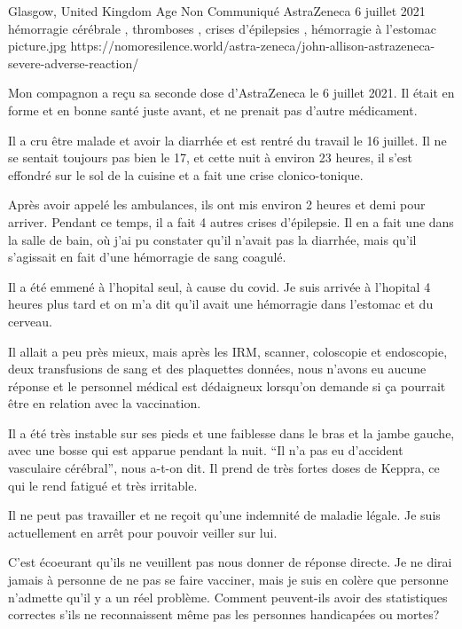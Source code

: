           {Glasgow, United Kingdom}
          {Age Non Communiqué}
          {AstraZeneca}
          {6 juillet 2021}
          {hémorragie cérébrale
            , thromboses
            , crises d'épilepsies
            , hémorragie à l'estomac}
          {picture.jpg}
          {https://nomoresilence.world/astra-zeneca/john-allison-astrazeneca-severe-adverse-reaction/}
          {

Mon compagnon a reçu sa seconde dose d'AstraZeneca le 6 juillet 2021. Il était
en forme et en bonne santé juste avant, et ne prenait pas d'autre médicament.

Il a cru être malade et avoir la diarrhée et est rentré du travail le 16
juillet. Il ne se sentait toujours pas bien le 17, et cette nuit à environ 23
heures, il s'est effondré sur le sol de la cuisine et a fait une crise
clonico-tonique.

Après avoir appelé les ambulances, ils ont mis environ 2 heures et demi pour
arriver. Pendant ce temps, il a fait 4 autres crises d'épilepsie. Il en a fait
une dans la salle de bain, où j'ai pu constater qu'il n'avait pas la diarrhée,
mais qu'il s'agissait en fait d'une hémorragie de sang coagulé.

Il a été emmené à l'hopital seul, à cause du covid. Je suis arrivée à l'hopital
4 heures plus tard et on m'a dit qu'il avait une hémorragie dans l'estomac et du
cerveau.

Il allait a peu près mieux, mais après les IRM, scanner, coloscopie et
endoscopie, deux transfusions de sang et des plaquettes données, nous n'avons eu
aucune réponse et le personnel médical est dédaigneux lorsqu'on demande si ça
pourrait être en relation avec la vaccination.

Il a été très instable sur ses pieds et une faiblesse dans le bras et la jambe
gauche, avec une bosse qui est apparue pendant la nuit. “Il n'a pas eu
d'accident vasculaire cérébral”, nous a-t-on dit. Il prend de très fortes doses
de Keppra, ce qui le rend fatigué et très irritable.

Il ne peut pas travailler et ne reçoit qu'une indemnité de maladie légale. Je
suis actuellement en arrêt pour pouvoir veiller sur lui.

C'est écoeurant qu'ils ne veuillent pas nous donner de réponse directe. Je ne
dirai jamais à personne de ne pas se faire vacciner, mais je suis en colère que
personne n'admette qu'il y a un réel problème. Comment peuvent-ils avoir des
statistiques correctes s'ils ne reconnaissent même pas les personnes handicapées
ou mortes?

}
